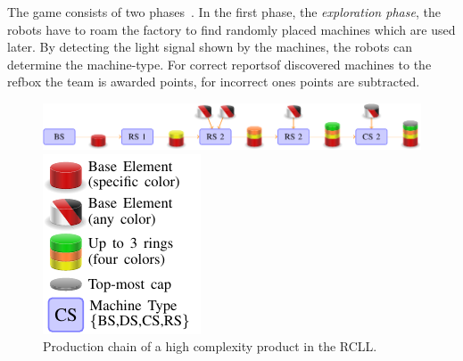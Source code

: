 \documentclass[a4paper,11pt]{article}
\begin{document}
The game consists of two phases~\cite{LLSF-Rules-2015}. In the first
phase, the \emph{exploration phase}, the robots have to roam the
factory to find randomly placed machines which are used later. By
detecting the light signal shown by the machines, the robots can
determine the machine-type. For correct reportsof discovered machines
to the refbox the team is awarded points, for incorrect ones points
are subtracted.
%
\begin{figure}[t]
  \centering
  \begin{minipage}{.8\linewidth}
  \includegraphics[width=\linewidth]{img/chain_c3}%
  \end{minipage}
  \quad%
  \begin{minipage}{.15\linewidth}
  \includegraphics[width=\linewidth]{img/legend}%
  \end{minipage}
  \caption{Production chain of a high complexity
    product in the RCLL.}
  \vspace{-2mm}
  \label{fig:prod-chain}
\end{figure}
\end{document}
